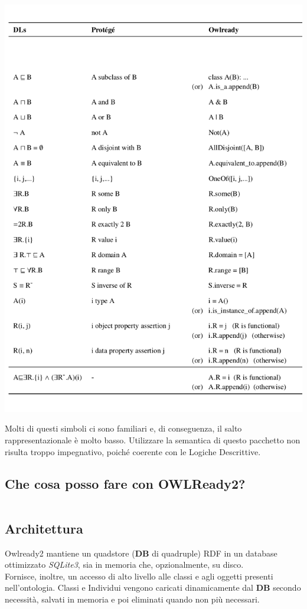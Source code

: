 \includegraphics[width=\linewidth]{immagini/ConversionTable.png}

Molti di questi simboli ci sono familiari e, di conseguenza, 
il salto rappresentazionale è molto basso.
Utilizzare la semantica di questo pacchetto non risulta troppo impegnativo, poiché coerente
con le Logiche Descrittive.

\subsection{Che cosa posso fare con OWLReady2?}
\inputminted{Python}{codice/IntroOwlReady2.py}

\subsection{Architettura}
Owlready2 mantiene un quadstore (\textbf{DB} di quadruple) RDF in un database ottimizzato \textit{SQLite3}, sia in memoria che, opzionalmente, su disco.\\
Fornisce, inoltre, un accesso di alto livello alle classi e agli oggetti presenti 
nell'ontologia. Classi e Individui vengono caricati dinamicamente dal \textbf{DB} secondo
necessità, salvati in memoria e poi eliminati quando non più necessari.

